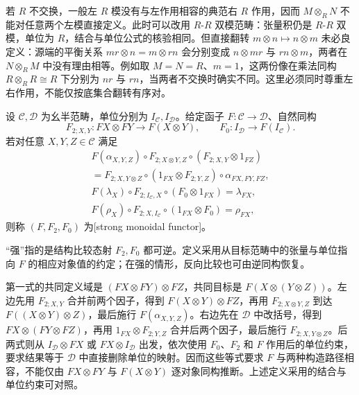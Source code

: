 \ProseParagraphBreak

若 \(R\) 不交换，一般左 \(R\) 模没有与左作用相容的典范右 \(R\) 作用，因而 \(M\otimes_RN\) 不能对任意两个左模直接定义。此时可以改用 \(R\)-\(R\) 双模范畴：张量积仍是 \(R\)-\(R\) 双模，单位为 \(R\)，结合与单位公式的核验相同。但直接翻转 \(m\otimes n\mapsto n\otimes m\) 未必良定义：源端的平衡关系 \(mr\otimes n=m\otimes rn\) 会分别变成 \(n\otimes mr\) 与 \(rn\otimes m\)，两者在 \(N\otimes_RM\) 中没有理由相等。例如取 \(M=N=R\)、\(m=1\)，这两份像在乘法同构 \(R\otimes_RR\cong R\) 下分别为 \(nr\) 与 \(rn\)，当两者不交换时确实不同。这里必须同时尊重左右作用，不能仅按底集合翻转有序对。

\begin{definition}\label{b4:def:strong-monoidal-functor}
	设 \(\mathcal C,\mathcal D\) 为幺半范畴，单位分别为 \(I_{\mathcal C},I_{\mathcal D}\)。给定函子 \(F:\mathcal C\to\mathcal D\)、自然同构
	\[
		F_{2;X,Y}:FX\otimes FY\longrightarrow F(X\otimes Y), \qquad F_0:I_{\mathcal D}\longrightarrow F(I_{\mathcal C}).
	\]
	若对任意 \(X,Y,Z\in\mathcal C\) 满足
	\[
		\begin{gathered}
			F(\alpha_{X,Y,Z})\circ F_{2;X\otimes Y,Z}\circ(F_{2;X,Y}\otimes1_{FZ})\\
			=F_{2;X,Y\otimes Z}\circ(1_{FX}\otimes F_{2;Y,Z}) \circ\alpha_{FX,FY,FZ},\\
			F(\lambda_X)\circ F_{2;I_{\mathcal C},X}\circ(F_0\otimes1_{FX}) =\lambda_{FX},\\
			F(\rho_X)\circ F_{2;X,I_{\mathcal C}}\circ(1_{FX}\otimes F_0) =\rho_{FX},
		\end{gathered}
	\]
	则称 \((F,F_2,F_0)\) 为[strong monoidal functor]。
\end{definition}

“强”指的是结构比较态射 \(F_2,F_0\) 都可逆。定义采用从目标范畴中的张量与单位指向 \(F\) 的相应对象值的约定；在强的情形，反向比较也可由逆同构恢复。

\ProseParagraphBreak
第一式的共同定义域是 \((FX\otimes FY)\otimes FZ\)，共同目标是 \(F(X\otimes(Y\otimes Z))\)。左边先用 \(F_{2;X,Y}\) 合并前两个因子，得到 \(F(X\otimes Y)\otimes FZ\)，再用 \(F_{2;X\otimes Y,Z}\) 到达 \(F((X\otimes Y)\otimes Z)\)，最后施行 \(F(\alpha_{X,Y,Z})\)。右边先在 \(\mathcal D\) 中改括号，得到 \(FX\otimes(FY\otimes FZ)\)，再用 \(1_{FX}\otimes F_{2;Y,Z}\) 合并后两个因子，最后施行 \(F_{2;X,Y\otimes Z}\)。后两式则从 \(I_{\mathcal D}\otimes FX\) 或 \(FX\otimes I_{\mathcal D}\) 出发，依次使用 \(F_0\)、\(F_2\) 和 \(F\) 作用后的单位约束，要求结果等于 \(\mathcal D\) 中直接删除单位的映射。因而这些等式要求 \(F\) 与两种构造路径相容，不能仅由 \(FX\otimes FY\) 与 \(F(X\otimes Y)\) 逐对象同构推断。上述定义采用的结合与单位约束可对照\cite[Definition 2.2.8, p. 25; Section 2.4, pp. 30--32]{EtingofEtAl2015TensorCategories}。

